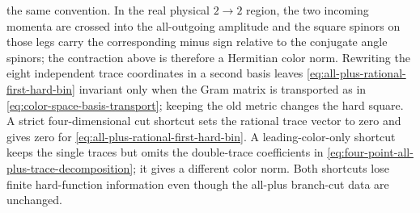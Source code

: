 \begin{controlledapproximation}
the same convention.  In the real physical \(2\to2\) region, the two incoming
momenta are crossed into the all-outgoing amplitude and the square spinors on
those legs carry the corresponding minus sign relative to the conjugate angle
spinors; the contraction above is therefore a Hermitian color norm.  Rewriting
the eight independent trace coordinates in a
second basis leaves
\eqref{eq:all-plus-rational-first-hard-bin} invariant only when the Gram matrix
is transported as in
\eqref{eq:color-space-basis-transport}; keeping the old metric changes the hard
square.  A strict four-dimensional cut shortcut sets the rational trace vector
to zero and gives zero for
\eqref{eq:all-plus-rational-first-hard-bin}.  A leading-color-only shortcut
keeps the single traces but omits the double-trace coefficients in
\eqref{eq:four-point-all-plus-trace-decomposition}; it gives a different color
norm.  Both shortcuts lose finite hard-function information even though the
all-plus branch-cut data are unchanged.
\end{controlledapproximation}

